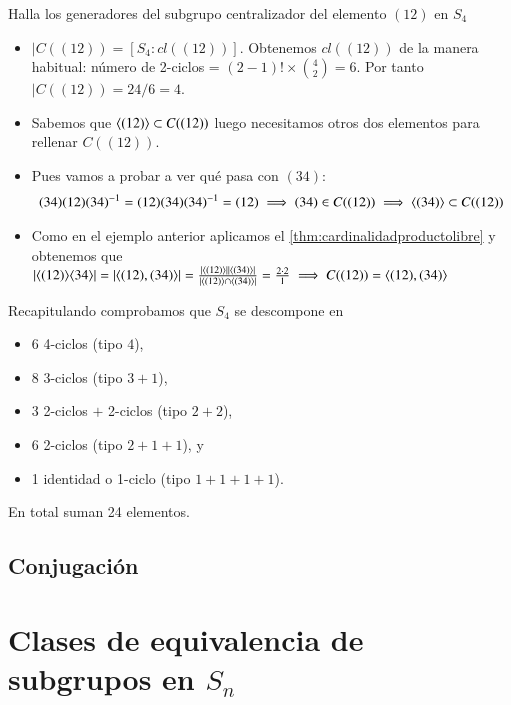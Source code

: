 \begin{ej}
	Halla los generadores del subgrupo centralizador del elemento $(12)$ en $S_4$
	
	\begin{itemize}
		\item $|C((12)) = [S_4:cl((12))]$. Obtenemos $cl((12))$ de la manera habitual: número de 2-ciclos = $(2-1)! \times \binom{4}{2} = 6$. Por tanto $|C((12)) = 24/6 = 4$.
		
		\item Sabemos que $\langle(12)\rangle \subset C((12))$ luego necesitamos otros dos elementos para rellenar $C((12))$.
		\item Pues vamos a probar a ver qué pasa con $(34)$:
		\begin{align*}
			(34)(12)(34)^{-1} = (12)(34)(34)^{-1} = (12) \implies (34) \in C((12)) \implies \langle(34)\rangle \subset C((12))
		\end{align*}
		\item Como en el ejemplo anterior aplicamos el \autoref{thm:cardinalidadproductolibre} y obtenemos que $|\langle(12)\rangle\langle34\rangle| = |\langle(12), (34)\rangle| = \frac{|\langle(12)\rangle||\langle(34)\rangle|}{|\langle(12)\rangle \cap \langle(34)\rangle|} = \frac{2\cdot2}{1} \implies C((12)) = \langle(12), (34)\rangle$
	\end{itemize}
\end{ej}

Recapitulando comprobamos que $S_4$ se descompone en
\begin{itemize}
	\item 6 4-ciclos (tipo $4$),
	\item 8 3-ciclos (tipo $3+1$),
	\item 3 2-ciclos $+$ 2-ciclos (tipo $2+2$),
	\item 6 2-ciclos (tipo $2+1+1$), y
	\item 1 identidad o 1-ciclo (tipo $1+1+1+1$).
\end{itemize}
En total suman 24 elementos.

\subsection{Conjugación}

\begin{thm}
	
\end{thm}

\section{Clases de equivalencia de subgrupos en $S_n$}

